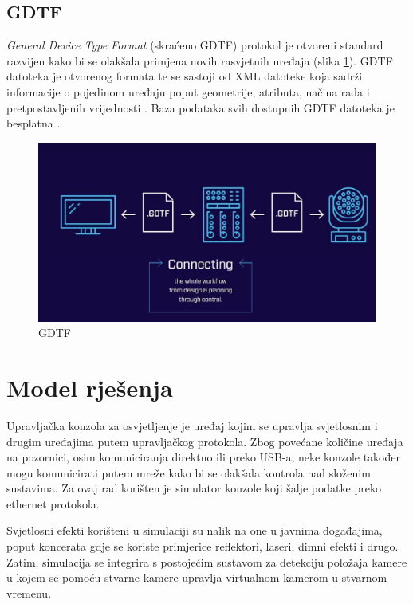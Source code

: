 \documentclass[times, utf8, zavrsni, numeric]{fer}
\begin{document}
\section{GDTF}
\emph{General Device Type Format} (skraćeno GDTF) protokol je otvoreni standard razvijen kako bi se olakšala primjena novih rasvjetnih uređaja (slika \ref{fig:slika 3-5}). GDTF datoteka je otvorenog formata te se sastoji od XML datoteke koja sadrži informacije o pojedinom uređaju poput geometrije, atributa, načina rada i pretpostavljenih vrijednosti \cite{dmx_gdtf}. Baza podataka svih dostupnih GDTF datoteka je besplatna \cite{GDTF}.\\

\begin{figure}[htp]
	\centering
	\includegraphics[width=\linewidth]{slika 3-5.png}
	\caption{GDTF \cite{GDTF}}
	\label{fig:slika 3-5}
\end{figure}

\chapter{Model rješenja}
Upravljačka konzola za osvjetljenje je uređaj kojim se upravlja svjetlosnim i drugim uređajima putem upravljačkog protokola. Zbog povećane količine uređaja na pozornici, osim komuniciranja direktno ili preko USB-a, neke konzole također mogu komunicirati putem mreže kako bi se olakšala kontrola nad složenim sustavima. Za ovaj rad korišten je simulator konzole koji šalje podatke preko ethernet protokola. \newline

Svjetlosni efekti korišteni u simulaciji su nalik na one u javnima događajima, poput koncerata gdje se koriste primjerice reflektori, laseri, dimni efekti i drugo.
Zatim, simulacija se integrira s postojećim sustavom za detekciju položaja kamere u kojem se pomoću stvarne kamere upravlja virtualnom kamerom u stvarnom vremenu.
\end{document}
